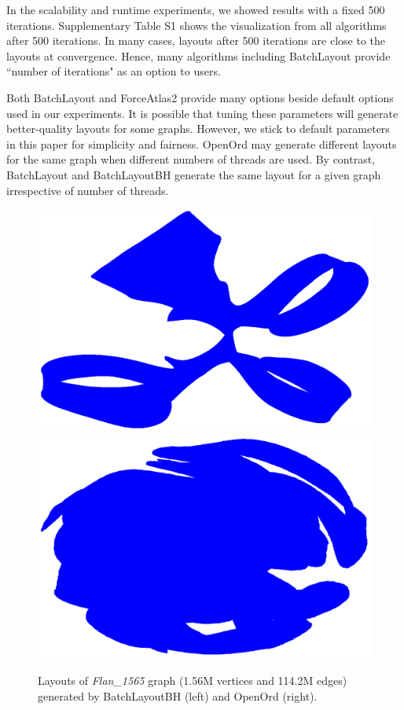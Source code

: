 \documentclass{vgtc}
\newcommand{\toolname}{{BatchLayout}}
\newcommand{\toolnameBH}{{BatchLayoutBH}}
\begin{document}
In the scalability and runtime experiments, we showed results with a fixed 500 iterations. %
Supplementary Table S1 shows the visualization from all algorithms after 500 iterations.
In many cases, layouts after 500 iterations are close to the layouts at convergence. 
Hence, many algorithms including \toolname{} provide ``number of iterations" as an option to users.   

Both \toolname{} and ForceAtlas2 provide many options beside default options used in our experiments. 
It is possible that tuning these parameters will generate better-quality layouts for some graphs.
However, we stick to default parameters in this paper for simplicity and fairness. 
OpenOrd may generate different layouts for the same graph when different numbers of threads are used.
By contrast, \toolname{} and \toolnameBH{} generate the same layout for a given graph irrespective of number of threads. 


\begin{figure}[!t]
\vspace{-0.1cm}
    \centering
    \includegraphics[width=0.48\linewidth]{layouts/FLan_BatchLayoutBH_5000.png}
    \includegraphics[width=0.48\linewidth]{layouts/Flan_OpenOrd_5000.png}
    \caption{Layouts of \emph{Flan\_1565} graph (1.56M vertices and 114.2M edges) generated by \toolnameBH{} (left) and
    OpenOrd (right).
    }
    \vspace{-0.4cm}
    \label{fig:verybiggraph}
\end{figure}
\end{document}
